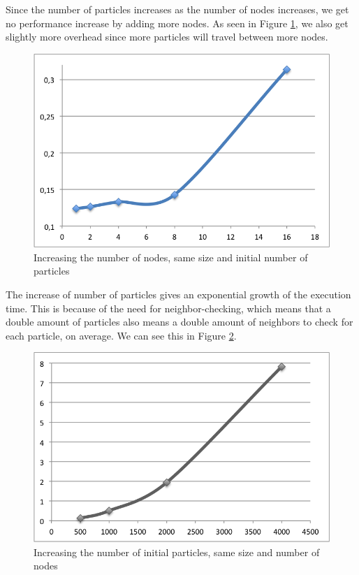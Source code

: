 \documentclass[a4paper]{article}
\begin{document}
Since the number of particles increases as the number of nodes
increases, we get no performance increase by adding more nodes. As seen
in Figure \ref{fig1}, we also get slightly more overhead since more
particles will travel between more nodes.\\

\begin{figure}
  \centering
  \includegraphics{processor_scale.png}
  \caption{Increasing the number of nodes, same size and initial number of particles}
  \label{fig1}
\end{figure}

The increase of number of particles gives an exponential growth of the
execution time. This is because of the need for neighbor-checking,
which means that a double amount of particles also means a double amount
of neighbors to check for each particle, on average. We can see this in
Figure \ref{fig2}.\\

\begin{figure}
  \centering
  \includegraphics{particles_scale.png}
  \caption{Increasing the number of initial particles, same size and number of nodes}
  \label{fig2}
\end{figure}
\end{document}
